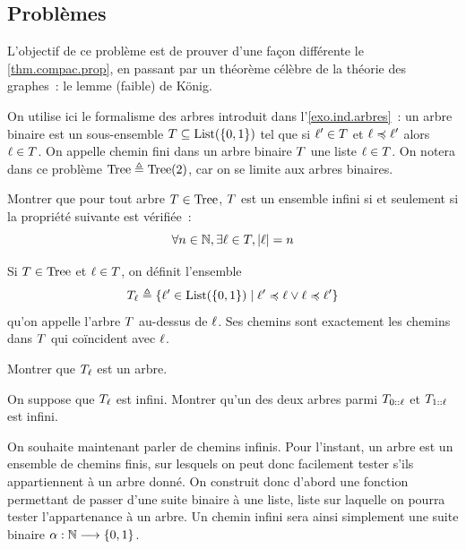 \clearpage

\subsection{Problèmes}

\begin{problem}
  L'objectif de ce problème est de prouver d'une façon différente le
  \cref{thm.compac.prop}, en passant par un théorème célèbre de la théorie des
  graphes~: le lemme (faible) de König.


  \noindent
  On utilise ici le formalisme des arbres introduit dans
  l'\cref{exo.ind.arbres}~: un arbre binaire est un sous-ensemble
  $T\subseteq \operatorname{List}(\{0,1\})$ tel que si $\ell' \in T$ et
  $\ell \preccurlyeq \ell'$ alors $\ell \in T$. On appelle chemin
  fini dans un arbre binaire $T$ une liste $\ell \in T$. On
  notera dans ce problème $\operatorname{Tree} \triangleq \operatorname{Tree}(2)$, car on se limite aux arbres
  binaires.

  \begin{pbQuest}
  \item Montrer que pour tout arbre $T \in \operatorname{Tree}$, $T$ est un
    ensemble infini si et seulement si la propriété suivante est vérifiée~:
    \[\forall n \in \mathbb N, \exists \ell \in T, \left\vert\ell\right\vert = n\]
  \end{pbQuest}

  \noindent
  Si $T \in \operatorname{Tree}$ et $\ell \in T$, on définit l'ensemble
  \[T_{\ell} \triangleq
  \left\{ \ell' \in \operatorname{List}(\{0,1\}) \;\middle\vert\; \ell' \preccurlyeq \ell \lor
    \ell \preccurlyeq \ell' \right\}\]
  qu'on appelle l'arbre $T$ au-dessus de $\ell$. Ses chemins sont
  exactement les chemins dans $T$ qui coïncident avec $\ell$.
  \begin{pbQuest}[resume]
  \item Montrer que $T_{\ell}$ est un arbre.
  \item\label{item.ind.pb1}
    On suppose que $T_{\ell}$ est infini. Montrer qu'un des deux
    arbres parmi $T_{0 \mathbin{::} \ell}$ et $T_{1 \mathbin{::} \ell}$ est
    infini.
  \end{pbQuest}

  \noindent
  On souhaite maintenant parler de chemins infinis. Pour l'instant, un arbre
  est un ensemble de chemins finis, sur lesquels on peut donc facilement tester
  s'ils appartiennent à un arbre donné. On construit donc d'abord une fonction
  permettant de passer d'une suite binaire à une liste, liste sur laquelle on
  pourra tester l'appartenance à un arbre. Un chemin infini sera ainsi
  simplement une suite binaire $\alpha : \displaystyle \mathbb N \longrightarrow \{0,1\}$.


\end{problem}
